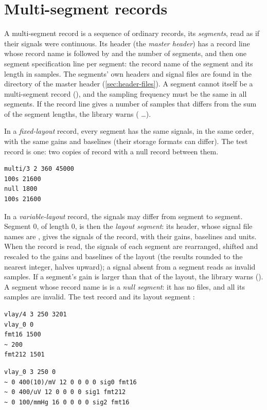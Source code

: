 \section{Multi-segment records}
\label{sec:multisegment}

A multi-segment record is a sequence of ordinary records, its
\emph{segments}, read as if their signals were continuous. Its header (the
\emph{master header}) has a record line whose record name is followed by
\code{/} and the number of segments, and then one segment specification
line per segment: the record name of the segment and its length in samples.
The segments' own headers and signal files are found in the directory of the
master header (\cref{sec:header-files}). A segment cannot itself be a
multi-segment record (), and the sampling frequency must be the same in all
segments. If the record line gives a number of samples that differs from the
sum of the segment lengths, the library warns
( \ldots).

In a \emph{fixed-layout} record, every segment has the same signals, in
the same order, with the same gains and baselines (their storage formats
can differ). The test record  is one: two copies
of record  with a null record between them.
\begin{lstlisting}[style=text]
multi/3 2 360 45000
100s 21600
null 1800
100s 21600
\end{lstlisting}

In a \emph{variable-layout} record, the signals may differ from segment to
segment. Segment 0, of length 0, is then the \emph{layout segment}: its
header, whose signal file names are \code{\textasciitilde}, gives the
signals of the record, with their gains, baselines and units. When the
record is read, the signals of each segment are rearranged, shifted and
rescaled to the gains and baselines of the layout (the results rounded to
the nearest integer, halves upward); a signal absent from a segment reads as
invalid samples. If a segment's gain is
larger than that of the layout, the library warns
(). A
segment whose record name is \code{\textasciitilde} is a \emph{null
segment}: it has no files, and all its samples are invalid. The test record
 and its layout segment :
\begin{lstlisting}[style=text]
vlay/4 3 250 3201
vlay_0 0
fmt16 1500
~ 200
fmt212 1501
\end{lstlisting}
\begin{lstlisting}[style=text]
vlay_0 3 250 0
~ 0 400(10)/mV 12 0 0 0 0 sig0 fmt16
~ 0 400/uV 12 0 0 0 0 sig1 fmt212
~ 0 100/mmHg 16 0 0 0 0 sig2 fmt16
\end{lstlisting}

